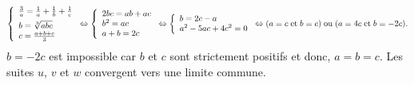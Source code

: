 {{$$
\left\{
\begin{array}{l}
\frac{3}{a}=\frac{1}{a}+\frac{1}{b}+\frac{1}{c}\\
\rule{0mm}{5mm}b=\sqrt[3]{abc}\\
c=\frac{a+b+c}{3}
\end{array}
\right.
\Leftrightarrow
\left\{
\begin{array}{l}
2bc=ab+ac\\
b^2=ac\\
a+b=2c
\end{array}
\right.
\Leftrightarrow
\left\{
\begin{array}{l}
b=2c-a\\
a^2-5ac+4c^2=0\\
\end{array}
\right.
\Leftrightarrow(a=c\;\mbox{et}\;b=c)\;\mbox{ou}\;(a=4c\;\mbox{et}\;b=-2c).$$
$b=-2c$ est impossible car $b$ et $c$ sont strictement positifs et donc, $a=b=c$.
Les suites $u$, $v$ et $w$ convergent vers une limite commune.
}
}

